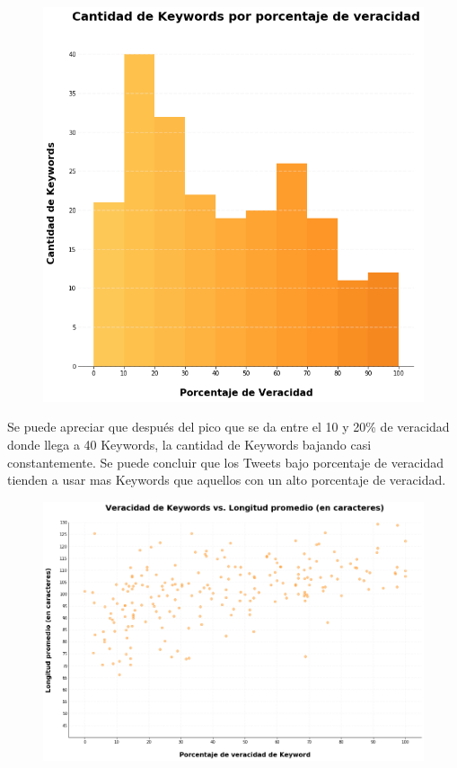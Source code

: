 \documentclass[titlepage,a4paper]{article}
\begin{document}
    
    \begin{figure}[H]
    \centering
    \includegraphics[width=1\textwidth]{graficos/Analisis de Keyword/cantidad_de_keywords_por_porcentaje_de_veracidad.png}
    \caption{} 
    \end{figure}
    
    Se puede apreciar que después del pico que se da entre el 10 y 20\% de veracidad donde llega a 40 Keywords, la cantidad de Keywords bajando casi constantemente. Se puede concluir que los Tweets bajo porcentaje de veracidad tienden a usar mas Keywords que aquellos con un alto porcentaje de veracidad.
    
    \begin{figure}[H]
    \centering
    \includegraphics[width=1\textwidth]{graficos/Analisis de Keyword/veracidad_keywords_vs_long_promedio_en_caracteres.png}
    \caption{} 
    \end{figure}
    
\end{document}
